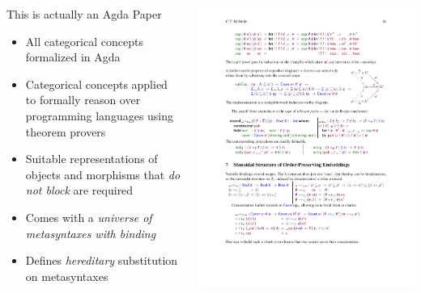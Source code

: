 \documentclass[aspectratio=169]{beamer}
\theoremstyle{remarkstyle}
\begin{document}
\begin{frame}[fragile]
  \begin{columns}
    \begin{column}{0.5\textwidth}
      \large{\color{bblue} This is actually an Agda Paper}
      \vspace{5mm}
      \begin{itemize}
        \item All categorical concepts formalized in Agda
        \item Categorical concepts applied to formally reason over programming languages using theorem provers
        \item Suitable representations of objects and morphisms that \emph{do not block} are required
        \item Comes with a \emph{universe of metasyntaxes with binding} 
        \item Defines \emph{hereditary} substitution on metasyntaxes 
      \end{itemize}
      \vspace{10mm}
    \end{column}
    \begin{column}{0.5\textwidth}
      \includegraphics[height=1.15\textheight]{egtbs-9.pdf}
    \end{column}
  \end{columns}
\end{frame}
\end{document}
